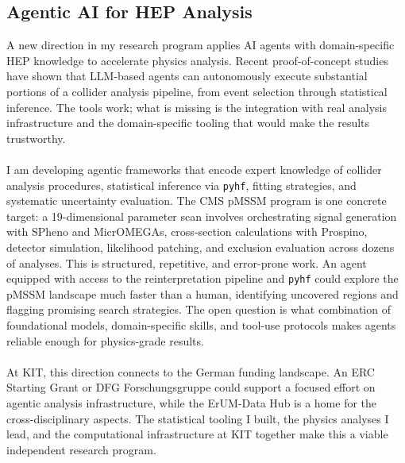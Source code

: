 \documentclass[10pt,a4paper,sans]{moderncv} %
\begin{document}
\subsection{Agentic AI for HEP Analysis}\label{sec:agentic}
A new direction in my research program applies AI agents with domain-specific HEP knowledge to accelerate physics analysis. Recent proof-of-concept studies~\cite{GendreauDistler:2025llm,Moreno:2026jfc} have shown that LLM-based agents can autonomously execute substantial portions of a collider analysis pipeline, from event selection through statistical inference. The tools work; what is missing is the integration with real analysis infrastructure and the domain-specific tooling that would make the results trustworthy.
\\
\\
I am developing agentic frameworks that encode expert knowledge of collider analysis procedures, statistical inference via \texttt{pyhf}, fitting strategies, and systematic uncertainty evaluation. The CMS pMSSM program is one concrete target: a 19-dimensional parameter scan involves orchestrating signal generation with SPheno and MicrOMEGAs, cross-section calculations with Prospino, detector simulation, likelihood patching, and exclusion evaluation across dozens of analyses. This is structured, repetitive, and error-prone work. An agent equipped with access to the reinterpretation pipeline and \texttt{pyhf} could explore the pMSSM landscape much faster than a human, identifying uncovered regions and flagging promising search strategies. The open question is what combination of foundational models, domain-specific skills, and tool-use protocols makes agents reliable enough for physics-grade results.
\\
\\
At KIT, this direction connects to the German funding landscape. An ERC Starting Grant or DFG Forschungsgruppe could support a focused effort on agentic analysis infrastructure, while the ErUM-Data Hub is a home for the cross-disciplinary aspects. The statistical tooling I built, the physics analyses I lead, and the computational infrastructure at KIT together make this a viable independent research program.
\end{document}
